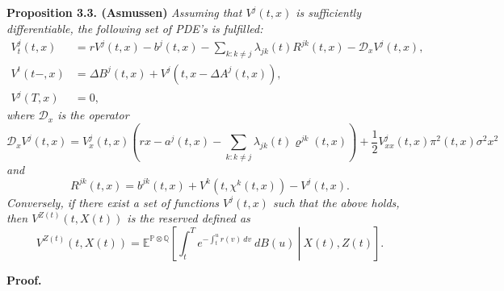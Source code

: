 \documentclass[
]{book}
\begin{document}
\textbf{Proposition 3.3. (Asmussen)} \emph{Assuming that \(V^j(t,x)\) is sufficiently differentiable, the following set of PDE's is fulfilled:}
\begin{align*}
V_t^j(t,x)&=rV^j(t,x)-b^j(t,x)-\sum_{k:k\ne j}\lambda_{jk}(t)R^{jk}(t,x)-\mathcal D_x V^j(t,x),\\
V^t(t-,x)&=\Delta B^j(t,x)+V^j(t,x-\Delta A^j(t,x)),\\
V^j(T,x)&=0,
\end{align*}
\emph{where \(\mathcal D_x\) is the operator}
\[
\mathcal D_xV^j(t,x)=V_x^j(t,x)\left(rx-a^j(t,x)-\sum_{k:k\ne j}\lambda_{jk}(t)\varrho^{jk}(t,x)\right)+\frac{1}{2}V^j_{xx}(t,x)\pi^2(t,x)\sigma^2x^2
\]
\emph{and}
\[
R^{jk}(t,x)=b^{jk}(t,x)+V^k(t,\chi^k(t,x))-V^j(t,x).
\]
\emph{Conversely, if there exist a set of functions \(V^j(t,x)\) such that the above holds, then \(V^{Z(t)}(t,X(t))\) is the reserved defined as}
\[
V^{Z(t)}(t,X(t))=\mathbb E^{\mathbb P\otimes\mathbb Q}\left[\left. \int_t^Te^{-\int_t^u r(v)\ dv}\ dB(u)\ \right\vert\ X(t),Z(t)\right].
\]

\textbf{Proof.}
\end{document}
